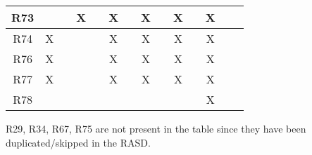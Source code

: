 \begin{table}[H]
\begin{tabular}{|c|c|c|c|c|c|c|c|c|c|c|c|c|c|}
\hline
{\cellcolor[rgb]{0.71,0.102,0}}R73 &    &    & X  &    & X  &    & X  &    & X  &      & X   &      \\ 
\hline
{\cellcolor[rgb]{0.71,0.102,0}}R74 & X  &    &    &    & X  &    & X  &    & X  &      & X   &      \\ 
\hline
{\cellcolor[rgb]{0.71,0.102,0}}R76 & X  &    &    &    & X  &    & X  &    & X  &      & X   &      \\ 
\hline
{\cellcolor[rgb]{0.71,0.102,0}}R77 & X  &    &    &    & X  &    & X  &    & X  &      & X   &      \\ 
\hline
{\cellcolor[rgb]{0.71,0.102,0}}R78 &    &    &    &    &    &    &    &    &    &      & X   &      \\
\hline
\end{tabular}
\end{table}
{\small R29, R34, R67, R75 are not present in the table since they have been duplicated/skipped in the RASD.}
